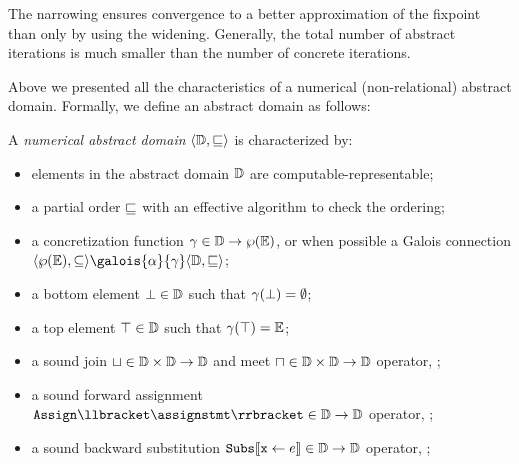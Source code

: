 \begin{description}
\begin{definition}[Narrowing]
\begin{itemize}
    \end{itemize}
  \end{definition}
  The narrowing ensures convergence to a better approximation of the fixpoint than only by using the widening. Generally, the total number of abstract iterations is much smaller than the number of concrete iterations.
  \end{description}

Above we presented all the characteristics of a numerical (non-relational) abstract domain. Formally, we define an abstract domain as follows:

\begin{definition}
  A \emph{numerical abstract domain} $\langle \mathbb{D}, \sqsubseteq \rangle$ is characterized by:
  \begin{itemize}
    \item elements in the abstract domain $\mathbb{D}$ are computable-representable;
    \item a partial order $\sqsubseteq$ with an effective algorithm to check the ordering;
    \item a concretization function $\gamma\in\mathbb{D}\to\wp(\mathbb{E})$, or when possible a Galois connection
    $\tuple{\setof\env}{\subseteq}\galois{\abstractdomainabstraction}{\abstractdomainconcretization}\tuple{\abstractdomain}{\abstractdomainsubseteq}$;
    \item a bottom element $\bot\in\mathbb{D}$ such that $\gamma(\bot) = \emptyset$;
    \item a top element $\top\in\mathbb{D}$ such that $\gamma(\top) = \mathbb{E}$;
    \item a sound join $\sqcup\in\mathbb{D}\times\mathbb{D}\to\mathbb{D}$ and meet $\sqcap\in\mathbb{D}\times\mathbb{D}\to\mathbb{D}$ operator, \cf{} ;
    \item a sound forward assignment $\abstractdomainassign\semanticsof{\assignstmt}\in\abstractdomain\to\abstractdomain$ operator, \cf{} ;
    \item a sound backward substitution $\textup{\texttt{Subs}}\llbracket \textup{\texttt{x}}\leftarrow e \rrbracket\in\mathbb{D}\to\mathbb{D}$ operator, \cf{} ;

\end{itemize}
\end{definition}
